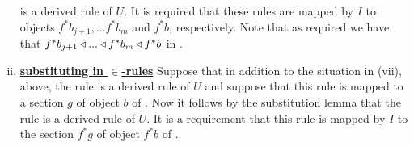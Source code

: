 \begin{definition}
\begin{enumerate}[(i)]
 is a derived rule of $U$.
It is required that these rules are mapped by $I$ to objects $f^*b_{j+1},...f^*b_m$ and $f^*b$, respectively.
Note that as required we have that $f^*b_{j+1}\triangleleft ... \triangleleft f^*b_m \triangleleft f^*b$ in \catc.

\item \underline{\textbf{substituting in $\boldsymbol {\in}$-rules}} 
Suppose that in addition to the situation in (vii), above, the rule
is a derived rule of $U$ and suppose that this rule is mapped to a section $g$ of object $b$ of \catc.
Now it follows by the substitution lemma that the rule
is a derived rule of $U$.
It is a requirement that this rule is mapped by $I$ to the section $f^*g$ of object $f^*b$ of \catc.
\end{enumerate}
\end{definition}

